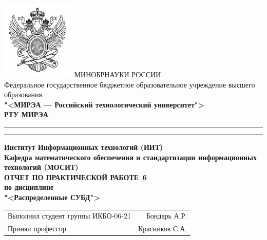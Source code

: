 \begin{titlepage}
	\thispagestyle{fancy}
	\renewcommand{\headrulewidth}{0pt}

	\centering
	\includegraphics[scale=0.5]{../res/logo} \break %
	МИНОБРНАУКИ РОССИИ\\
	Федеральное государственное бюджетное образовательное учреждение
	высшего образования\\
	\textbf{"<МИРЭА --- Российский технологический университет">}\\
	\textbf{РТУ МИРЭА}\\
	\bigskip \hrule \smallskip \hrule
	\vfill
	\vfill
	\textbf{Институт Информационных технологий (ИИТ)}\\
	\textbf{Кафедра математического обеспечения
		и стандартизации информационных технологий (МОСИТ)}\\
	\vfill
	\vfill
	\textbf{ОТЧЕТ ПО ПРАКТИЧЕСКОЙ РАБОТЕ \No\,6}\\
	\textbf{по дисциплине}\\
	\textbf{"<Распределенные СУБД">}
	\vfill
	\vfill
	\vfill
	\vfill
	\begin{tabular}{lr}
		Выполнил студент группы ИКБО-06-21 & Бондарь А.Р.\\
		Принял профессор & Красников С.А.\\
	\end{tabular}
	\vfill
	\vfill
	\vfill
\end{titlepage}
\setcounter{page}{2}
\clearpage

